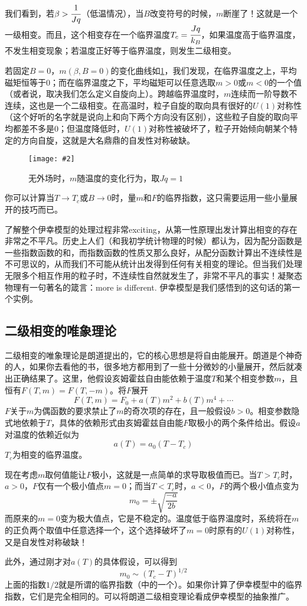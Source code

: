\documentclass[a4paper,11pt]{ctexart}
\newcommand{\beq}{\begin{equation}}
\newcommand{\eeq}{\end{equation}}
\newcommand{\red}{\color{red}}
\newcommand{\cpic}[2]{
\begin{center}
\texttt{[image: \#2]}
\end{center}
}
\newcommand{\cpicn}[3]
{
\begin{figure}[H]
\cpic{#1}{#2}
\caption{#3\label{#2}}
\end{figure}
}
\begin{document}
\par
我们看到，若$\beta > \cfrac{1}{Jq}$（低温情况），当$B$改变符号的时候，$m$断崖了！这就是一个一级相变。而且，这个相变存在一个临界温度$T_c = \cfrac{Jq}{k_B}$，如果温度高于临界温度，不发生相变现象；若温度正好等于临界温度，则发生二级相变。
\par
若固定$B = 0$，$m(\beta,B=0)$的变化曲线如\cref{isingtrans}，我们发现，在临界温度之上，平均磁矩恒等于0；而在临界温度之下，平均磁矩可以任意选取$m>0$或$m<0$的一个值（或者说，取决我们怎么定义自旋向上）。跨越临界温度时，$m$连续而一阶导数不连续，这也是一个二级相变。在高温时，粒子自旋的取向具有很好的$U(1)$对称性（这个好听的名字就是说向上和向下两个方向没有区别），这些粒子自旋的取向平均都差不多是0；但温度降低时，$U(1)$对称性被破坏了，粒子开始倾向朝某个特定的方向自旋，这就是大名鼎鼎的{\red 自发性对称破缺}。
\cpicn{0.3}{isingtrans}{无外场时，$m$随温度的变化行为，取$Jq = 1$}
\par
你可以计算当$T\to T_c$或$B \to 0$时，量$m$和$F$的临界指数，这只需要运用一些小量展开的技巧而已。
\par
了解整个伊幸模型的处理过程非常exciting，从第一性原理出发计算出相变的存在非常之不平凡。历史上人们（和我初学统计物理的时候）都认为，因为配分函数是一些指数函数的和，而指数函数的性质又那么良好，从配分函数计算出不连续性是不可思议的，从而我们不可能从统计出发得到任何有关相变的理论。但当我们处理无限多个相互作用的粒子时，不连续性自然就发生了，非常不平凡的事实！凝聚态物理有一句著名的箴言：more is different. 伊幸模型是我们感悟到的这句话的第一个实例。

\subsection{二级相变的唯象理论}
二级相变的唯象理论是朗道提出的，它的核心思想是将自由能展开。朗道是个神奇的人，如果你去看他的书，很多地方都用到了一些十分微妙的小量展开，然后就凑出正确结果了。这里，他假设亥姆霍兹自由能依赖于温度$T$和某个相变参数$m$，且恒有$F(T,m) = F(T,-m)$。将$F$展开
\beq
F(T,m) = F_0 + a(T)m^2 + b(T)m^4 + \cdots
\eeq
$F$关于$m$为偶函数的要求禁止了$m$的奇次项的存在，且一般假设$b>0$。相变参数隐式地依赖于$T$，具体的依赖形式由亥姆霍兹自由能$F$取极小的两个条件给出。假设$a$对温度的依赖近似为
\beq
a(T) = a_0 (T-T_c)
\eeq
$T_c$为相变的临界温度。
\par
现在考虑$m$取何值能让$F$极小，这就是一点简单的求导取极值而已。当$T>T_c$时，$a>0$，$F$仅有一个极小值点$m=0$；而当$T<T_c$时，$a<0$，$F$的两个极小值点变为
\beq
m_0 = \pm \sqrt{\frac{-a}{2b}}
\eeq
而原来的$m=0$变为极大值点，它是不稳定的。温度低于临界温度时，系统将在$m$的正负两个取值中任意选择一个，这个选择破坏了$m=0$时原有的$U(1)$对称性，又是自发性对称破缺！
\par
此外，通过刚才对$a(T)$的具体假设，可以得到
\beq
m_0 \sim (T_c - T)^{1/2}
\eeq
上面的指数$1/2$就是所谓的临界指数（中的一个）。如果你计算了伊幸模型中的临界指数，它们是完全相同的。可以将朗道二级相变理论看成伊幸模型的抽象推广。
\end{document}

